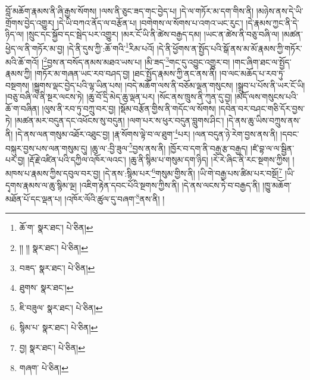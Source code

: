 བློ་མཆོག་རྣམས་ནི་ཞི་རྒྱས་སོགས། །ལས་ནི་ཅུང་ཟད་གང་བྱེད་པ། །དེ་ལ་གཏོར་མ་དག་གིས་ནི། །མཉེས་ནས་དེ་ཡི་གྲོགས་བྱེད་འགྱུར། །དེ་ཡི་བཀའ་ནོད་ལ་བརྩོན་པ། །བགེགས་ལ་སོགས་པ་འགའ་ཡང་རུང་། །དེ་རྣམས་ཀྱང་ནི་དེ་ཉིད་ལ། །སྲུང་དང་སྐྱོབ་དང་སྦེད་པར་འགྱུར། །མར་ངོ་ཡི་ནི་ཚེས་བརྒྱད་དམ། །ཡང་ན་ཚེས་ནི་བཅུ་བཞི་ལ། །མཚན་ཕྱེད་ལ་ནི་གཏོར་མ་བྱ། །དེ་ནི་དུས་ཀྱི་:ཆོ་གའི་\footnote{ཆོ་ག་  སྣར་ཐང་།  པེ་ཅིན། }རིམ་པའོ། །དེ་ནི་ཕྱོགས་ན་སྤྱོད་པའི་སྒོ་ནས་མ་མོ་རྣམས་ཀྱི་གཏོར་མའི་ཆོ་གའོ། །\footnote{།། །།  སྣར་ཐང་།  པེ་ཅིན། }བྱས་ན་བསོད་ནམས་མཐའ་ཡས་པ། །མི་ཟད་\footnote{བཟད་  སྣར་ཐང་།  པེ་ཅིན། }གང་དུ་འབྱུང་འགྱུར་བ། །གང་ཞིག་ཐང་ལ་སྤྱོད་རྣམས་ཀྱི། །གཏོར་མ་གཞན་ཡང་རབ་བཤད་བྱ། །ཐང་སྤྱོད་རྣམས་ཀྱི་ནང་ནས་ནི། །བ་ལང་མཆོད་པ་རབ་ཏུ་བསྔགས། །སྐྱུགས་ལྡང་བྱེད་པའི་ལྷ་ཡིན་པས། །བདེ་མཆོག་ལས་ནི་བཅོམ་ལྡན་གསུངས། །སྒྲུབ་པ་པོས་ནི་ཡར་ངོ་ཡི། །བཅུ་བཞི་ལ་ནི་སྔར་ལངས་ཏེ། །ཆུ་བོ་དྲི་མེད་ཆུ་ལྡན་པར། །སོང་ནས་ཁྲུས་ནི་ཀུན་དུ་བྱ། །མདོ་ལས་གསུངས་པའི་ཆོ་ག་བཞིན། །ལུས་ནི་རབ་ཏུ་བཀྲུ་བར་བྱ། །སྡོམ་བརྩོན་གྱིས་ནི་གདོང་ལ་སོགས། །དབེན་བར་བཤང་གཅི་དོར་བྱས་ཏེ། །མཚན་མར་བདུན་དང་འཕོངས་སུ་བདུན། །ལག་པར་ས་ཕུར་བདུན་བླུགས་ཤིང་། །དེ་ནས་ཆུ་ཡིས་བཀྲུས་ནས་ནི། །དེ་ནས་ལན་གསུམ་འཐོར་འཐུང་བྱ། །རྣ་སོགས་ལྟེ་བ་ལ་ཐུག་\footnote{ཐུགས་  སྣར་ཐང་། }པར། །ལན་བདུན་ཉེ་རེག་བྱས་ནས་ནི། །དབང་བསྐུར་བྱས་པས་ལན་གསུམ་དུ། །ཆུ་ལ་:བྱི་ཟུལ་\footnote{ཇི་བཟུལ་  སྣར་ཐང་།  པེ་ཅིན། }བྱས་ནས་ནི། །ཁྱོར་བ་དག་ནི་བརྒྱ་རྩ་བརྒྱད། །ཛཾ་བྷ་ལ་ལ་སྦྱིན་པར་བྱ། །རྡོ་རྗེ་འཛིན་པའི་དཀྱིལ་འཁོར་ལའང་། །ཆུ་ནི་སྙིམ་པ་གསུམ་དག་ཉིད། །རེ་རེ་ཞིང་ནི་རང་སྔགས་ཀྱིས། །མཁས་པ་རྣམས་ཀྱིས་དབུལ་བར་བྱ། །དེ་ནས་:སྙིམ་པར་\footnote{སྙིམ་པ་  སྣར་ཐང་།  པེ་ཅིན། }གསུམ་གྱིས་ནི། །ཡི་གེ་བརྒྱ་པས་ཚིམ་པར་བསྔོ།\footnote{བྱ།  སྣར་ཐང་།  པེ་ཅིན། } །ཡི་དྭགས་རྣམས་ལ་ཆུ་སྙིམ་ལྔ། །འཇིག་རྟེན་དབང་པོའི་སྔགས་ཀྱིས་ནི། །དེ་ནས་ལངས་ཏེ་བ་བརྒྱད་ནི། །ཁྱུ་མཆོག་མཐོན་པོ་དང་ལྡན་པ། །འཁོར་ལོའི་ཚུལ་དུ་བཞག་\footnote{གཞག་  པེ་ཅིན། }ནས་ནི། །
